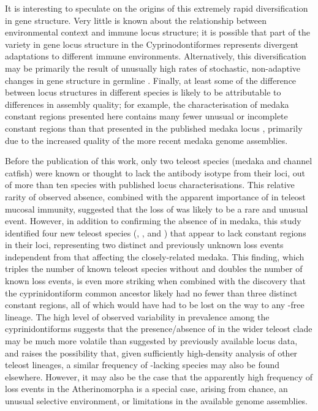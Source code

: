 It is interesting to speculate on the origins of this extremely rapid diversification in gene structure. Very little is known about the relationship between environmental context and immune locus structure; it is possible that part of the variety in \igh{} gene locus structure in the Cyprinodontiformes represents divergent adaptations to different immune environments. Alternatively, this diversification may be primarily the result of unusually high rates of stochastic, non-adaptive changes in gene structure in germline \igh{}. Finally, at least some of the difference between locus structures in different species is likely to be attributable to differences in assembly quality; for example, the characterisation of medaka constant regions presented here contains many fewer unusual or incomplete constant regions than that presented in the published medaka \igh{} locus \parencite{magadan2011medaka}, primarily due to the increased quality of the more recent medaka genome assemblies.

Before the publication of this work, only two teleost species (medaka and channel catfish) were known or thought to lack the  antibody isotype from their \igh{} loci, out of more than ten species with published locus characterisations. This relative rarity of observed absence, combined with the apparent importance of  in teleost mucosal immunity, suggested that the loss of  was likely to be a rare and unusual event. However, in addition to confirming the absence of  in medaka, this study identified four new teleost species (\nfu, ,  and ) that appear to lack  constant regions in their \igh{} loci, representing two distinct and previously unknown loss events independent from that affecting the closely-related medaka. This finding, which triples the number of known teleost species without  and doubles the number of known loss events, is even more striking when combined with the discovery that the cyprinidontiform common ancestor likely had no fewer than three distinct  constant regions, all of which would have had to be lost on the way to any -free lineage. The high level of observed variability in  prevalence among the cyprinidontiforms suggests that the presence/absence of  in the wider teleost clade may be much more volatile than suggested by previously available locus data, and raises the possibility that, given sufficiently high-density analysis of other teleost lineages, a similar frequency of -lacking species may also be found elsewhere. However, it may also be the case that the apparently high frequency of  loss events in the Atherinomorpha is a special case, arising from chance, an unusual selective environment, or limitations in the available genome assemblies.

